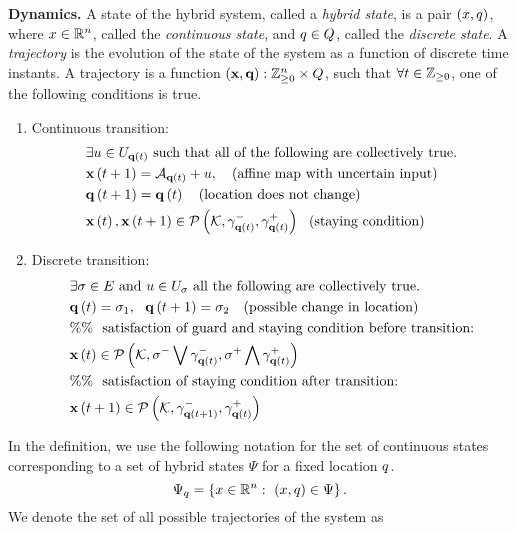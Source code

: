 {\bf Dynamics.}  A state of the hybrid system, called a \emph{hybrid
  state}, is a pair $(x,q)$, where $x\in\mathbb{R}^n$, called the {\it
  continuous state}, and $q\in Q$, called the {\it discrete
  state}.  A {\it trajectory} is the evolution of the state of the
  system as a function of discrete time instants.  A trajectory is a
  function $\maphtrj:\integers_{\geq 0}\ra\reals^n\times\locations$,
  such that $\forall t\in\mathbb{Z}_{\geq 0}$, one of the following
  conditions is true.
%
\begin{enumerate}
\item Continuous transition:
%
\begin{align}
& \exists u\in U_{{\bf q}\left(t\right)}~\text{such that all of the following are collectively true.}\nonumber\\
& {\bf x}\left(t+1\right)=\mathcal{A}_{{\bf q}\left(t\right)}+u,~~~\text{(affine map with uncertain input)}\nonumber\\
& {\bf q}\left(t+1\right)={\bf q}\left(t\right)~~~\text{(location does not change)}\nonumber\\
& {\bf x}\left(t\right),{\bf x}\left(t+1\right)\in\mathcal{P}\left(\mathcal{K},\gamma_{{\bf q}\left(t\right)}^-,\gamma_{{\bf q}\left(t\right)}^+\right)~~\text{(staying condition)}~~\label{eqn:cont-transition}
\end{align}
\item Discrete transition:
\begin{align}
& \exists \sigma\in E~\text{and}~u\in U_{\sigma}~\text{all the following are collectively true.}\nonumber\\
& {\bf q}\left(t\right)=\sigma_1,~~{\bf q}\left(t+1\right)=\sigma_2~~~\text{(possible change in location)}\nonumber\\
& \%\%~~\text{satisfaction of guard and staying condition before transition:}\nonumber\\
& {\bf x}\left(t\right)\in\mathcal{P}\left(\mathcal{K},\sigma^-\bigvee \gamma_{{\bf q}\left(t\right)}^-,\sigma^+\bigwedge \gamma_{{\bf q}\left(t\right)}^+\right)\nonumber\\
& \%\%~~\text{satisfaction of staying condition after transition:}\nonumber\\
& {\bf x}\left(t+1\right)\in\mathcal{P}\left(\mathcal{K},\gamma_{{\bf q}\left(t+1\right)}^-,\gamma_{{\bf q}\left(t\right)}^+\right)~~\label{eqn:dis-transition}
\end{align}
\end{enumerate}
%
In the definition, we use the following notation for the set of
continuous states corresponding to a set of hybrid states $\Psi$ for a
fixed location $q$.  
%
\[
\Psi_q=\left\{x\in\mathbb{R}^n:~(x,q)\in\Psi\right\}.
\]
%
We denote the set of all possible trajectories of the system as
